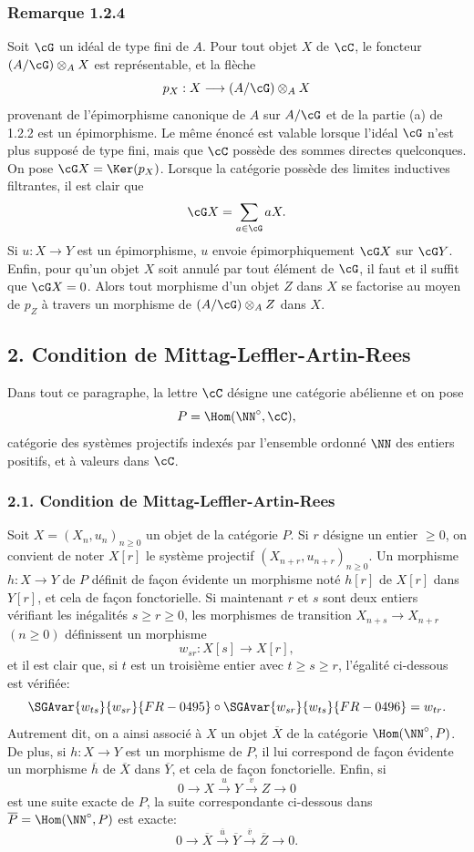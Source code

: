 \subsubsection*{Remarque 1.2.4}
Soit $\cG$ un idéal de type fini de $A$. Pour tout objet $X$ de $\cC$, le foncteur $(A/\cG)\otimes_A X$ est représentable, et la flèche
\[
p_X:X\longrightarrow (A/\cG)\otimes_A X
\]
provenant de l'épimorphisme canonique de $A$ sur $A/\cG$ et de la partie (a) de 1.2.2 est un épimorphisme. Le même énoncé est valable lorsque l'idéal $\cG$ n'est plus supposé de type fini, mais que $\cC$ possède des sommes directes quelconques. On pose $\cG X=\Ker(p_X)$. Lorsque la catégorie possède des limites inductives filtrantes, il est clair que
\[
\cG X=\sum_{a\in\cG}aX.
\]
Si $u:X\to Y$ est un épimorphisme, $u$ envoie épimorphiquement $\cG X$ sur $\cG Y$. Enfin, pour qu'un objet $X$ soit annulé par tout élément de $\cG$, il faut et il suffit que $\cG X=0$. Alors tout morphisme d'un objet $Z$ dans $X$ se factorise au moyen de $p_Z$ à travers un morphisme de $(A/\cG)\otimes_A Z$ dans $X$.

\subsection*{2. Condition de Mittag-Leffler-Artin-Rees}
Dans tout ce paragraphe, la lettre $\cC$ désigne une catégorie abélienne et on pose
\[
P=\Hom(\NN^\circ,\cC),
\]
catégorie des systèmes projectifs indexés par l'ensemble ordonné $\NN$ des entiers positifs, et à valeurs dans $\cC$.

\subsubsection*{2.1. Condition de Mittag-Leffler-Artin-Rees}
Soit $X=(X_n,u_n)_{n\ge0}$ un objet de la catégorie $P$. Si $r$ désigne un entier $\ge0$, on convient de noter $X[r]$ le système projectif $(X_{n+r},u_{n+r})_{n\ge0}$. Un morphisme $h:X\to Y$ de $P$ définit de façon évidente un morphisme noté $h[r]$ de $X[r]$ dans $Y[r]$, et cela de façon fonctorielle. Si maintenant $r$ et $s$ sont deux entiers vérifiant les inégalités $s\ge r\ge0$, les morphismes de transition $X_{n+s}\to X_{n+r}$ $(n\ge0)$ définissent un morphisme
\[
w_{sr}:X[s]\longrightarrow X[r],
\]
et il est clair que, si $t$ est un troisième entier avec $t\ge s\ge r$, l'égalité ci-dessous est
vérifiée:
\[
\SGAvar{w_{ts}}{w_{sr}}{FR-0495}\circ \SGAvar{w_{sr}}{w_{ts}}{FR-0496}=w_{tr}.
\]
Autrement dit, on a ainsi associé à $X$ un objet $\overline X$ de la catégorie $\Hom(\NN^\circ,P)$. De plus, si $h:X\to Y$ est un morphisme de $P$, il lui correspond de façon évidente un morphisme $\overline h$ de $\overline X$ dans $\overline Y$, et cela de façon fonctorielle. Enfin, si
\[
0\longrightarrow X\stackrel{u}{\longrightarrow}Y\stackrel{v}{\longrightarrow}Z\longrightarrow0
\]
est une suite exacte de $P$, la suite correspondante ci-dessous dans $\overline P=\Hom(\NN^\circ,P)$ est exacte:
\[
0\longrightarrow\overline X\stackrel{\overline u}{\longrightarrow}\overline Y\stackrel{\overline v}{\longrightarrow}\overline Z\longrightarrow0.
\]

